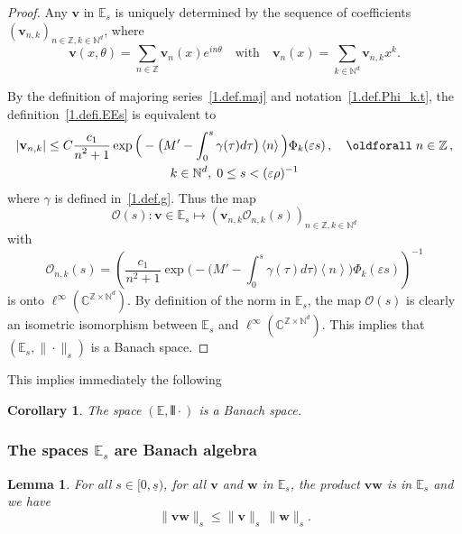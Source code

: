 \documentclass[10pt]{amsart}
\newtheorem{lemm}[cdrthm]{Lemma}
\newtheorem{coro}[cdrthm]{Corollary}
\theoremstyle{definition}
\theoremstyle{plain}
\newcommand*\e{\varepsilon}
\newcommand*\Cbb{{\mathbb C}}%
\newcommand*\N{{\mathbb N}}
\newcommand*\Z{{\mathbb Z}}
\newcommand*\EE{{\mathbb E}}
\newcommand*\g{\gamma}
\newcommand{\vbf}{{\mathbf v}}
\newcommand*\w{{\mathbf w}}
\newcommand*\und{\underline}
\DeclarePairedDelimiter{\VERT}{|\mkern -1.6mu|\mkern -1.6mu|}{|\mkern -1.6mu|\mkern -1.6mu|}
\renewcommand*{\forall}{\mathrel{\oldforall}}
\begin{document}
\begin{proof}
Any $\vbf$ in $\EE_{s}$ is uniquely determined by the sequence of coefficients $(\vbf_{n,k})_{n\in\Z,k\in\N^{d}}$, where
\[
\vbf(x,\theta) = \sum_{n\in\Z} \vbf_n(x) e^{in\theta} \quad \text{with} \quad \vbf_n(x) = \sum_{k\in\N^{d}} \vbf_{n,k}x^{k}.
\]


By the definition of majoring series~\eqref{1.def.maj} and notation~\eqref{1.def.Phi_k.t}, the definition~\eqref{1.defi.EEs} is equivalent to
\begin{multline*}
|\vbf_{n,k}| \leq C \frac{\displaystyle c_1}{\displaystyle n^2+1}\exp\Big({}-\big(M' - \int_{0}^{s} \g(\tau) d\tau \big)\left< n \right>\Big) \Phi_{k}(\e s) \,,\quad \forall n\in\Z\,,\\
k\in\N^{d},\; 0\leq s < (\e \rho)^{-1}
\end{multline*}
where $\g$ is defined in~\eqref{1.def.g}. Thus the map
\goodbreak
\begin{equation}
\mathcal{O}(s): \vbf\in\EE_{s} \mapsto \left(\vbf_{n,k} \mathcal{O}_{n,k}(s)\right)_{n\in\Z, k\in\N^{d}}
\end{equation}
with
\[
\mathcal{O}_{n,k}(s) = \left(\frac{\displaystyle c_1}{\displaystyle n^2+1}\exp\Big({}-\big(M' - \int_{0}^{s} \g(\tau) d\tau \big)\left< n \right>\Big) \Phi_{k}(\e s)\right)^{-1}
\]
is onto $ \ell^{\infty}(\Cbb^{\Z\times\N^{d}}) $. By definition of the norm in $\EE_{s}$, the map $\mathcal{O}(s)$ is clearly an isometric isomorphism between $\EE_{s}$ and $\ell^{\infty}(\Cbb^{\Z\times\N^{d}})$. This implies that $\left(\EE_{s},\|\cdot\|_{s}\right)$ is a Banach space.
\end{proof}

This implies immediately the following

\begin{coro}
The space $(\EE,\VERT{\cdot})$ is a Banach space.
\end{coro}


\subsubsection{The spaces \texorpdfstring{$\EE_s$}{EEs} are Banach algebra}


\begin{lemm}\label{1.lemma.algebra}
For all $s\in[0,\und{s})$, for all $\vbf$ and $\w$ in $\EE_{s}$, the product $ \vbf\w$ is in $\EE_{s} $ and we have
\begin{equation} 
\|\vbf \w\|_{s} \leq \|\vbf\|_{s} \, \|\w\|_{s}.
\end{equation}
\end{lemm}
\end{document}
